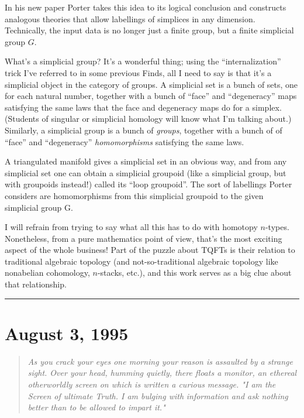 \documentclass{article}
\begin{document}
In his new paper Porter takes this idea to its logical conclusion and
constructs analogous theories that allow labellings of simplices in any
dimension. Technically, the input data is no longer just a finite group,
but a finite simplicial group \(G\).

What's a simplicial group? It's a wonderful thing; using the
``internalization'' trick I've referred to in some previous Finds, all I
need to say is that it's a simplicial object in the category of groups.
A simplicial set is a bunch of sets, one for each natural number,
together with a bunch of ``face'' and ``degeneracy'' maps satisfying the
same laws that the face and degeneracy maps do for a simplex. (Students
of singular or simplicial homology will know what I'm talking about.)
Similarly, a simplicial group is a bunch of \emph{groups}, together with
a bunch of of ``face'' and ``degeneracy'' \emph{homomorphisms}
satisfying the same laws.

A triangulated manifold gives a simplicial set in an obvious way, and
from any simplicial set one can obtain a simplicial groupoid (like a
simplicial group, but with groupoids instead!) called its ``loop
groupoid''. The sort of labellings Porter considers are homomorphisms
from this simplicial groupoid to the given simplicial group G.

I will refrain from trying to say what all this has to do with homotopy
\(n\)-types. Nonetheless, from a pure mathematics point of view, that's
the most exciting aspect of the whole business! Part of the puzzle about
TQFTs is their relation to traditional algebraic topology (and
not-so-traditional algebraic topology like nonabelian cohomology,
\(n\)-stacks, etc.), and this work serves as a big clue about that
relationship.

\begin{center}\rule{0.5\linewidth}{0.5pt}\end{center}



\hypertarget{week59}{%
\section{August 3, 1995}\label{week59}}

\begin{quote}
\emph{As you crack your eyes one morning your reason is assaulted by a}
\emph{strange sight. Over your head, humming quietly, there floats a}
\emph{monitor, an ethereal otherworldly screen on which is written a
curious} \emph{message. "I am the Screen of ultimate Truth. I am bulging
with} \emph{information and ask nothing better than to be allowed to
impart it."}
\end{quote}
\end{document}
